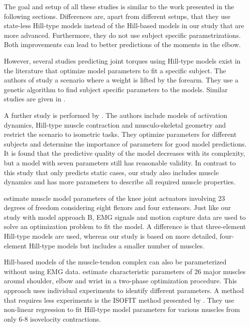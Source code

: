 The goal and setup of all these studies is similar to the work presented in the following sections. Differences are, apart from different setups, that they use state-less Hill-type models instead of the Hill-based models in our study that are more advanced. Furthermore, they do not use subject specific parametrizations. Both improvements can lead to better predictions of the moments in the elbow.

%
However, several studies predicting joint torques using Hill-type models exist in the literature that optimize model parameters to fit a specific subject.
The authors of \cite{Cavallaro2005, Cavallaro2006} study a scenario where a weight is lifted by the forearm. They use a genetic algorithm to find subject specific parameters to the models. Similar studies are given in \cite{Lloyd2003,Venture2005,Pontonnier2009,Sartori2012}.

A further study is performed by \cite{Heine2003}. The authors include models of activation dynamics, Hill-type muscle contraction and musculo-skeletal geometry and restrict the scenario to isometric tasks. They optimize parameters for different subjects and determine the importance of parameters for good model predictions. It is found that the predictive quality of the model decreases with its complexity, but a model with seven parameters still has reasonable validity. 
In contrast to this study that only predicts static cases, our study also includes muscle dynamics and has more parameters to describe all required muscle properties.

\cite{Falisse2016} estimate muscle model parameters of the knee joint actuators involving 23 degrees of freedom considering eight flexors and four extensors. Just like our study with model approach B, EMG signals and motion capture data are used to solve an optimization problem to fit the model. A difference is that three-element Hill-type models are used, whereas our study is based on more detailed, four-element Hill-type models but includes a smaller number of muscles.

Hill-based models of the muscle-tendon complex can also be parameterized without using EMG data.
\cite{Garner2003} estimate characteristic parameters of 26 major muscles around shoulder, elbow and  wrist in a two-phase optimization procedure. This approach uses individual experiments to identify different parameters. A method that requires less experiments is the ISOFIT method presented by \cite{Wagner2005}. They use non-linear regression to fit Hill-type model parameters for various muscles from only 6-8 isovelocity contractions.

